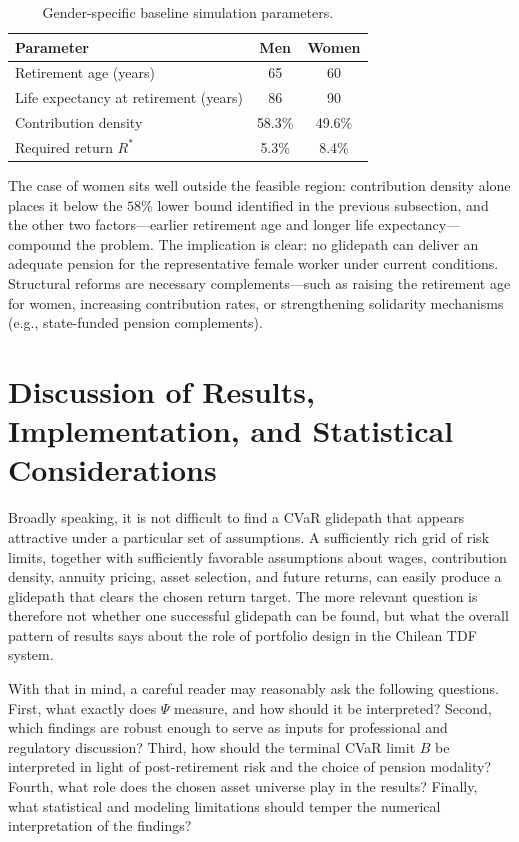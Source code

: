 \documentclass[11pt]{article}
\begin{document}
\begin{table}[H]
  \centering
  \caption{Gender-specific baseline simulation parameters.}
  \label{tab:gender}
  \begin{tabular}{@{}lcc@{}}
    \toprule
    Parameter & Men & Women \\
    \midrule
    Retirement age (years)          & 65      & 60      \\
    Life expectancy at retirement (years) & 86 & 90     \\
    Contribution density            & 58.3\%  & 49.6\%  \\
    Required return $R^*$           & 5.3\%   & 8.4\%   \\
    \bottomrule
  \end{tabular}
\end{table}

The case of women sits well outside the feasible region: contribution density 
alone places it below the $58\%$ lower bound identified in the previous 
subsection, and the other two factors---earlier retirement age and longer 
life expectancy---compound the problem. The implication is clear: no 
glidepath can deliver an adequate pension for the representative female 
worker under current conditions. Structural reforms are necessary 
complements---such as raising the retirement age for women, increasing 
contribution rates, or strengthening solidarity mechanisms (e.g., state-funded pension complements).

\section{Discussion of Results, Implementation, and Statistical Considerations}

Broadly speaking, it is not difficult to find a CVaR glidepath that appears 
attractive under a particular set of assumptions. A sufficiently rich grid of 
risk limits, together with sufficiently favorable assumptions about wages, 
contribution density, annuity pricing, asset selection, and future returns, 
can easily produce a glidepath that clears the chosen return target. The more 
relevant question is therefore not whether one successful glidepath can be 
found, but what the overall pattern of results says about the role 
of portfolio design in the Chilean TDF system.

With that in mind, a careful reader may reasonably ask the following questions. 
First, what exactly does $\Psi$ measure, and how should it be interpreted? 
Second, which findings are robust enough to serve as inputs for professional 
and regulatory discussion? Third, how should the terminal CVaR limit $B$ be 
interpreted in light of post-retirement risk and the choice of pension modality? 
Fourth, what role does the chosen asset universe play in the results? 
Finally, what statistical and modeling limitations should temper the numerical 
interpretation of the findings?
\end{document}
